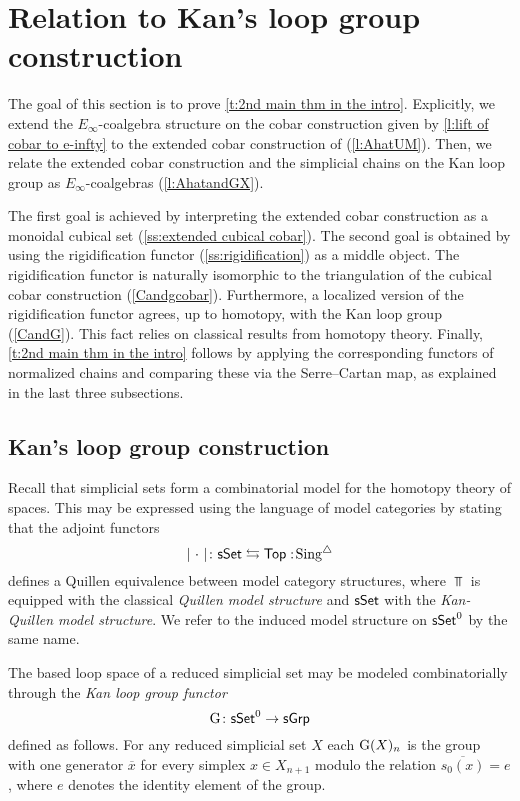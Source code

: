 
\section{Relation to Kan's loop group construction} \label{s:theorem2}

The goal of this section is to prove \cref{t:2nd main thm in the intro}.
Explicitly, we extend the $E_{\infty}$-coalgebra structure on the cobar construction given by \cref{l:lift of cobar to e-infty} to the extended cobar construction of \cite{hess2010cobar} (\cref{l:AhatUM}). Then, we relate the extended cobar construction and the simplicial chains on the Kan loop group as $E_{\infty}$-coalgebras (\cref{l:AhatandGX}).

The first goal is achieved by interpreting the extended cobar construction as a monoidal cubical set (\cref{ss:extended cubical cobar}).
The second goal is obtained by using the rigidification functor (\cref{ss:rigidification}) as a middle object. The rigidification functor is naturally isomorphic to the triangulation of the cubical cobar construction (\cref{Candgcobar}). Furthermore, a localized version of the rigidification functor agrees, up to homotopy, with the Kan loop group (\cref{CandG}). This fact relies on classical results from homotopy theory. Finally, \cref{t:2nd main thm in the intro} follows by applying the corresponding functors of normalized chains and comparing these via the Serre--Cartan map, as explained in the last three subsections.

\subsection{Kan's loop group construction}

Recall that simplicial sets form a combinatorial model for the homotopy theory of spaces.
This may be expressed using the language of model categories by stating that the adjoint functors
\[
\lvert\ \cdot\ \rvert \colon \mathsf{sSet} \leftrightarrows \mathsf{Top} :\! \operatorname{Sing^{\triangle}}
\]
defines a Quillen equivalence between model category structures, where $\Top$ is equipped with the classical \textit{Quillen model structure} and $\mathsf{sSet}$ with the \textit{Kan-Quillen model structure}.
We refer to the induced model structure on $\mathsf{sSet}^0$ by the same name.

The based loop space of a reduced simplicial set may be modeled combinatorially through the \textit{Kan loop group functor}
\[
\operatorname{G} \colon \mathsf{sSet}^0 \to \mathsf{sGrp}
\]
defined as follows.
For any reduced simplicial set $X$ each $\operatorname{G}(X)_n$ is the group with one generator $\overline{x}$ for every simplex $x \in X_{n+1}$ modulo the relation $\overline{s_0(x)} = e$, where $e$ denotes the identity element of the group.

